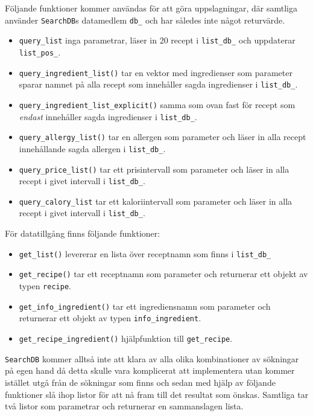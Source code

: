 Följande funktioner kommer användas för att göra uppslagningar, där samtliga
använder \verb+SearchDB+s datamedlem \verb+db_+ och har således inte något
returvärde.

  \begin{itemize}
    \item \verb+query_list+ inga parametrar, läser in 20 recept i
      \verb+list_db_+ och uppdaterar \verb+list_pos_+.
    \item \verb+query_ingredient_list()+ tar en vektor med ingredienser som
      parameter sparar namnet på alla recept som innehåller sagda ingredienser i
      \verb+list_db_+.
    \item \verb+query_ingredient_list_explicit()+ samma som ovan fast för recept
      som \emph{endast} innehåller sagda ingredienser i \verb+list_db_+.
    \item \verb+query_allergy_list()+ tar en allergen som parameter och läser in
      alla recept innehållande sagda allergen i \verb+list_db_+.
    \item \verb+query_price_list()+ tar ett prisintervall som parameter och
      läser in alla recept i givet intervall i \verb+list_db_+.
    \item \verb+query_calory_list+ tar ett kaloriintervall som parameter och
      läser in alla recept i givet intervall i \verb+list_db_+.
  \end{itemize}
 

För datatillgång finns följande funktioner:

\begin{itemize}
\item \verb+get_list()+ levererar en lista över receptnamn som finns i
  \verb+list_db_+
\item \verb+get_recipe()+ tar ett receptnamn som parameter och returnerar ett
  objekt av typen \verb+recipe+.
\item \verb+get_info_ingredient()+ tar ett ingrediensnamn som parameter och
  returnerar ett objekt av typen \verb+info_ingredient+.
\item \verb+get_recipe_ingredient()+ hjälpfunktion till \verb+get_recipe+.
\end{itemize}

\verb+SearchDB+ kommer alltså inte att klara av alla olika kombinationer av sökningar på egen hand då detta skulle vara komplicerat att implementera utan kommer istället utgå från de sökningar som finns och sedan med hjälp av följande funktioner slå ihop listor för att nå fram till det resultat som önskas. Samtliga tar två listor som parametrar och returnerar en sammanslagen lista.

